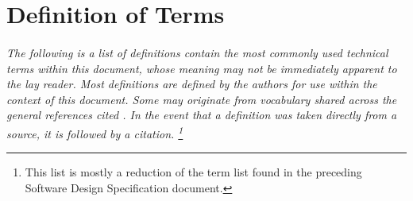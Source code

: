 \documentclass[12pt]{article}
\begin{document}
\section{Definition of Terms} \label{defs}

\paragraph{} \textit{The following is a list of definitions contain the most commonly used 
technical terms within this document, whose meaning may not be immediately apparent to the 
lay reader. Most definitions are defined by the authors for use within the context of this 
document. Some may originate from vocabulary shared across the general references cited \nocite{*}. 
In the event that a definition was taken directly from a source, it is followed by a citation.
\footnote{This list is mostly a reduction of the term list found in the preceding Software 
Design Specification document.}}
\end{document}
